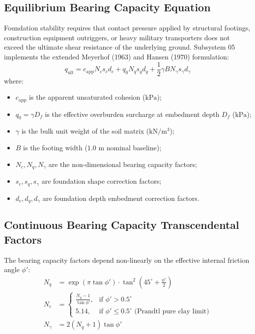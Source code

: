 \documentclass[11pt,a4paper]{article}
\theoremstyle{definition}
\theoremstyle{remark}
\begin{document}
\subsection{Equilibrium Bearing Capacity Equation}
Foundation stability requires that contact pressure applied by structural footings, construction equipment outriggers, or heavy military transporters does not exceed the ultimate shear resistance of the underlying ground. Subsystem 05 implements the extended Meyerhof (1963) and Hansen (1970) formulation:
\begin{equation}
    q_{\text{ult}} = c_{\text{app}} N_c s_c d_c + q_0 N_q s_q d_q + \frac{1}{2} \gamma B N_\gamma s_\gamma d_\gamma
    \label{eq:full_meyerhof_hansen}
\end{equation}
\noindent where:
\begin{itemize}
    \item $c_{\text{app}}$ is the apparent unsaturated cohesion ($\text{kPa}$);
    \item $q_0 = \gamma D_f$ is the effective overburden surcharge at embedment depth $D_f$ ($\text{kPa}$);
    \item $\gamma$ is the bulk unit weight of the soil matrix ($\text{kN}/\text{m}^3$);
    \item $B$ is the footing width ($1.0\text{ m}$ nominal baseline);
    \item $N_c, N_q, N_\gamma$ are the non-dimensional bearing capacity factors;
    \item $s_c, s_q, s_\gamma$ are foundation shape correction factors;
    \item $d_c, d_q, d_\gamma$ are foundation depth embedment correction factors.
\end{itemize}

\subsection{Continuous Bearing Capacity Transcendental Factors}
The bearing capacity factors depend non-linearly on the effective internal friction angle $\phi'$:
\begin{align}
    N_q &= \exp(\pi \tan \phi') \cdot \tan^2\left( 45^\circ + \frac{\phi'}{2} \right) \label{eq:nq_factor} \\
    N_c &= \begin{cases} 
        \frac{N_q - 1}{\tan \phi'}, & \text{if } \phi' > 0.5^\circ \\
        5.14, & \text{if } \phi' \le 0.5^\circ \text{ (Prandtl pure clay limit)}
    \end{cases} \label{eq:nc_factor} \\
    N_\gamma &= 2 (N_q + 1) \tan \phi' \label{eq:ngamma_factor}
\end{align}
\end{document}
